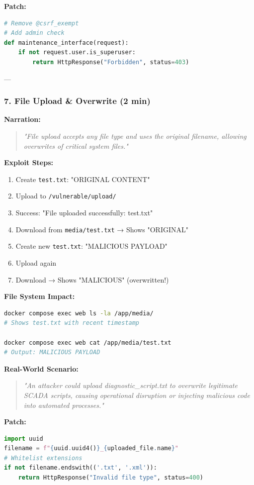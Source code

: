 \documentclass[12pt,a4paper]{article}
\begin{document}
\textbf{Patch:}
\begin{lstlisting}[language=Python]
# Remove @csrf_exempt
# Add admin check
def maintenance_interface(request):
    if not request.user.is_superuser:
        return HttpResponse("Forbidden", status=403)
\end{lstlisting}

---

\subsubsection{7. File Upload \& Overwrite (2 min)}

\textbf{Narration:}
\begin{quote}
\textit{"File upload accepts any file type and uses the original filename, allowing overwrites of critical system files."}
\end{quote}

\textbf{Exploit Steps:}
\begin{enumerate}
    \item Create \texttt{test.txt}: "ORIGINAL CONTENT"
    \item Upload to \texttt{/vulnerable/upload/}
    \item Success: "File uploaded successfully: test.txt"
    \item Download from \texttt{media/test.txt} → Shows "ORIGINAL"
    \item Create new \texttt{test.txt}: "MALICIOUS PAYLOAD"
    \item Upload again
    \item Download → Shows "MALICIOUS" (overwritten!)
\end{enumerate}

\textbf{File System Impact:}
\begin{lstlisting}[language=bash]
docker compose exec web ls -la /app/media/
# Shows test.txt with recent timestamp

docker compose exec web cat /app/media/test.txt
# Output: MALICIOUS PAYLOAD
\end{lstlisting}

\textbf{Real-World Scenario:}
\begin{quote}
\textit{"An attacker could upload diagnostic\_script.txt to overwrite legitimate SCADA scripts, causing operational disruption or injecting malicious code into automated processes."}
\end{quote}

\textbf{Patch:}
\begin{lstlisting}[language=Python]
import uuid
filename = f"{uuid.uuid4()}_{uploaded_file.name}"
# Whitelist extensions
if not filename.endswith(('.txt', '.xml')):
    return HttpResponse("Invalid file type", status=400)
\end{lstlisting}
\end{document}
